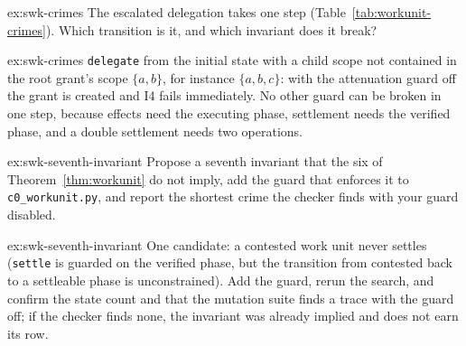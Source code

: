 \documentclass[11pt,a4paper]{article}
\theoremstyle{definition}
\theoremstyle{remark}
\begin{document}

\begin{pdexercise}[kind=Check,rating=1]{ex:swk-crimes}
The escalated delegation takes one step (Table~\ref{tab:workunit-crimes}). Which transition is it, and which invariant does it break?
\end{pdexercise}
\begin{pdsolution}{ex:swk-crimes}
\texttt{delegate} from the initial state with a child scope not contained in the root grant's scope $\{a,b\}$, for instance $\{a,b,c\}$: with the attenuation guard off the grant is created and I4 fails immediately. No other guard can be broken in one step, because effects need the executing phase, settlement needs the verified phase, and a double settlement needs two operations.
\end{pdsolution}
\begin{pdexercise}[kind=Open,rating=3]{ex:swk-seventh-invariant}
Propose a seventh invariant that the six of Theorem~\ref{thm:workunit} do not imply, add the guard that enforces it to \texttt{c0\_workunit.py}, and report the shortest crime the checker finds with your guard disabled.
\end{pdexercise}
\begin{pdsolution}{ex:swk-seventh-invariant}
One candidate: a contested work unit never settles (\texttt{settle} is guarded on the verified phase, but the transition from contested back to a settleable phase is unconstrained). Add the guard, rerun the search, and confirm the state count and that the mutation suite finds a trace with the guard off; if the checker finds none, the invariant was already implied and does not earn its row.
\end{pdsolution}
\end{document}

